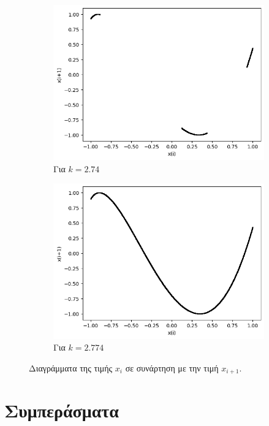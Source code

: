 \begin{figure}[ht]
\begin{subfigure}[b]{0.4\textwidth}
		\includegraphics[width=\textwidth]{LateX images/cheb q=0.9/g10}
		\caption{Για $k=2.74$}
		\label{f:k148}
	\end{subfigure}
	\hfill	
	\begin{subfigure}[b]{0.4\textwidth}
		\centering
		\includegraphics[width=\textwidth]{LateX images/cheb q=0.9/g11}
		\caption{Για $k=2.774$}
		\label{f:k149}
	\end{subfigure}
	\hfill
	
	\caption{Διαγράμματα της τιμής \(x_i\) σε συνάρτηση με την τιμή \(x_{i+1}\).}
	\label{f:k251}
\end{figure}

\clearpage

\section{Συμπεράσματα}

